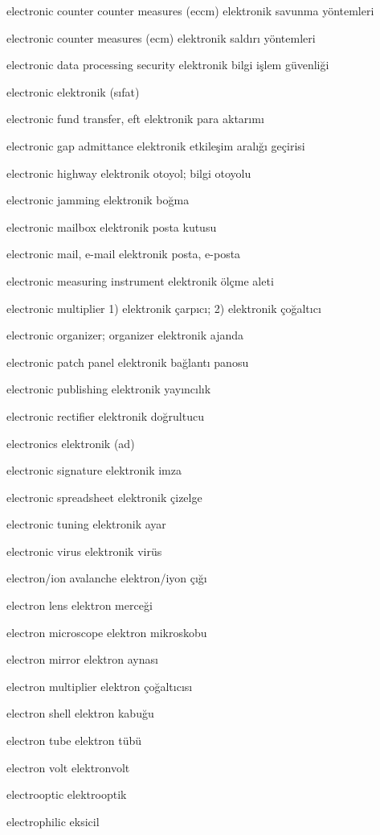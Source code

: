 \documentclass[12pt,fleqn]{article}\usepackage{../../common}
\begin{document}
electronic counter counter measures (eccm) elektronik savunma yöntemleri

electronic counter measures (ecm) elektronik saldırı yöntemleri

electronic data processing security elektronik bilgi işlem güvenliği

electronic elektronik (sıfat)

electronic fund transfer, eft elektronik para aktarımı

electronic gap admittance elektronik etkileşim aralığı geçirisi

electronic highway elektronik otoyol; bilgi otoyolu

electronic jamming elektronik boğma

electronic mailbox elektronik posta kutusu

electronic mail, e-mail elektronik posta, e-posta

electronic measuring instrument elektronik ölçme aleti

electronic multiplier 1) elektronik çarpıcı; 2) elektronik çoğaltıcı

electronic organizer; organizer elektronik ajanda

electronic patch panel elektronik bağlantı panosu

electronic publishing elektronik yayıncılık

electronic rectifier elektronik doğrultucu

electronics elektronik (ad)

electronic signature elektronik imza

electronic spreadsheet elektronik çizelge

electronic tuning elektronik ayar

electronic virus elektronik virüs

electron/ion avalanche elektron/iyon çığı

electron lens elektron merceği

electron microscope elektron mikroskobu

electron mirror elektron aynası

electron multiplier elektron çoğaltıcısı

electron shell elektron kabuğu

electron tube elektron tübü

electron volt elektronvolt

electrooptic elektrooptik

electrophilic eksicil
\end{document}
